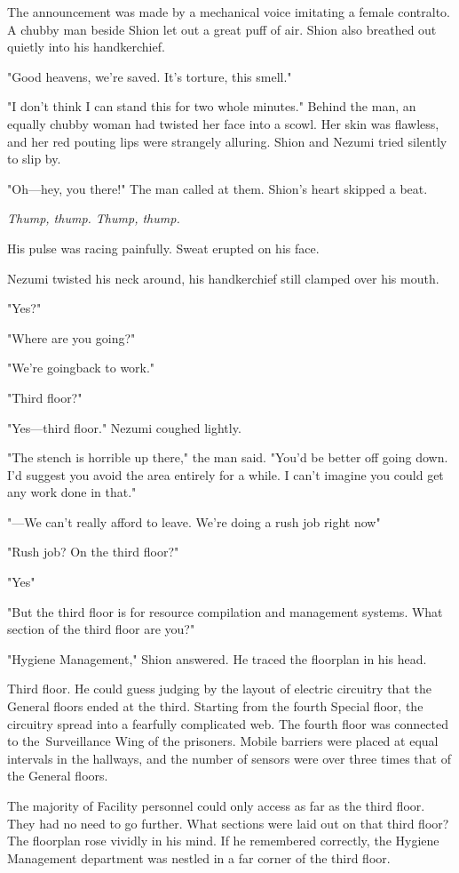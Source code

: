 The announcement was made by a mechanical voice imitating a female
contralto. A chubby man beside Shion let out a great puff of air. Shion
also breathed out quietly into his handkerchief.

"Good heavens, we're saved. It's torture, this smell."

"I don't think I can stand this for two whole minutes." Behind the man,
an equally chubby woman had twisted her face into a scowl. Her skin was
flawless, and her red pouting lips were strangely alluring. Shion and
Nezumi tried silently to slip by.

"Oh---hey, you there!" The man called at them. Shion's heart skipped a
beat.

\emph{Thump, thump. Thump, thump.}

His pulse was racing painfully. Sweat erupted on his face.

Nezumi twisted his neck around, his handkerchief still clamped over his
mouth.

"Yes?"

"Where are you going?"

"We're going\el back to work."

"Third floor?"

"Yes---third floor." Nezumi coughed lightly.

"The stench is horrible up there," the man said. "You'd be better off
going down. I'd suggest you avoid the area entirely for a while. I can't
imagine you could get any work done in that."

"---We can't really afford to leave. We're doing a rush job right now\el "

"Rush job? On the third floor?"

"Yes\el "

"But the third floor is for resource compilation and management systems.
What section of the third floor are you?"

"Hygiene Management," Shion answered. He traced the floorplan in his
head.

Third floor. He could guess judging by the layout of electric circuitry
that the General floors ended at the third. Starting from the fourth
Special floor, the circuitry spread into a fearfully complicated web.
The fourth floor was connected to the~Surveillance Wing of the
prisoners. Mobile barriers were placed at equal intervals in the
hallways, and the number of sensors were over three times that of the
General floors.

The majority of Facility personnel could only access as far as the third
floor. They had no need to go further. What sections were laid out on
that third floor? The floorplan rose vividly in his mind. If he
remembered correctly, the Hygiene Management department was nestled in a
far corner of the third floor.

